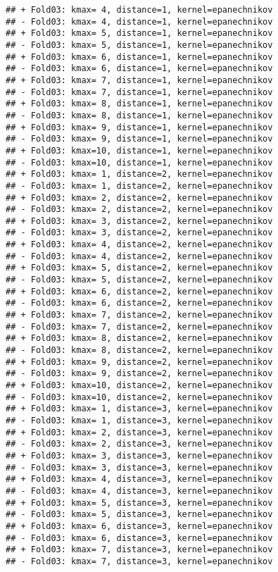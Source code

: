 \documentclass[
]{article}
\begin{document}
\begin{verbatim}
## + Fold03: kmax= 4, distance=1, kernel=epanechnikov 
## - Fold03: kmax= 4, distance=1, kernel=epanechnikov 
## + Fold03: kmax= 5, distance=1, kernel=epanechnikov 
## - Fold03: kmax= 5, distance=1, kernel=epanechnikov 
## + Fold03: kmax= 6, distance=1, kernel=epanechnikov 
## - Fold03: kmax= 6, distance=1, kernel=epanechnikov 
## + Fold03: kmax= 7, distance=1, kernel=epanechnikov 
## - Fold03: kmax= 7, distance=1, kernel=epanechnikov 
## + Fold03: kmax= 8, distance=1, kernel=epanechnikov 
## - Fold03: kmax= 8, distance=1, kernel=epanechnikov 
## + Fold03: kmax= 9, distance=1, kernel=epanechnikov 
## - Fold03: kmax= 9, distance=1, kernel=epanechnikov 
## + Fold03: kmax=10, distance=1, kernel=epanechnikov 
## - Fold03: kmax=10, distance=1, kernel=epanechnikov 
## + Fold03: kmax= 1, distance=2, kernel=epanechnikov 
## - Fold03: kmax= 1, distance=2, kernel=epanechnikov 
## + Fold03: kmax= 2, distance=2, kernel=epanechnikov 
## - Fold03: kmax= 2, distance=2, kernel=epanechnikov 
## + Fold03: kmax= 3, distance=2, kernel=epanechnikov 
## - Fold03: kmax= 3, distance=2, kernel=epanechnikov 
## + Fold03: kmax= 4, distance=2, kernel=epanechnikov 
## - Fold03: kmax= 4, distance=2, kernel=epanechnikov 
## + Fold03: kmax= 5, distance=2, kernel=epanechnikov 
## - Fold03: kmax= 5, distance=2, kernel=epanechnikov 
## + Fold03: kmax= 6, distance=2, kernel=epanechnikov 
## - Fold03: kmax= 6, distance=2, kernel=epanechnikov 
## + Fold03: kmax= 7, distance=2, kernel=epanechnikov 
## - Fold03: kmax= 7, distance=2, kernel=epanechnikov 
## + Fold03: kmax= 8, distance=2, kernel=epanechnikov 
## - Fold03: kmax= 8, distance=2, kernel=epanechnikov 
## + Fold03: kmax= 9, distance=2, kernel=epanechnikov 
## - Fold03: kmax= 9, distance=2, kernel=epanechnikov 
## + Fold03: kmax=10, distance=2, kernel=epanechnikov 
## - Fold03: kmax=10, distance=2, kernel=epanechnikov 
## + Fold03: kmax= 1, distance=3, kernel=epanechnikov 
## - Fold03: kmax= 1, distance=3, kernel=epanechnikov 
## + Fold03: kmax= 2, distance=3, kernel=epanechnikov 
## - Fold03: kmax= 2, distance=3, kernel=epanechnikov 
## + Fold03: kmax= 3, distance=3, kernel=epanechnikov 
## - Fold03: kmax= 3, distance=3, kernel=epanechnikov 
## + Fold03: kmax= 4, distance=3, kernel=epanechnikov 
## - Fold03: kmax= 4, distance=3, kernel=epanechnikov 
## + Fold03: kmax= 5, distance=3, kernel=epanechnikov 
## - Fold03: kmax= 5, distance=3, kernel=epanechnikov 
## + Fold03: kmax= 6, distance=3, kernel=epanechnikov 
## - Fold03: kmax= 6, distance=3, kernel=epanechnikov 
## + Fold03: kmax= 7, distance=3, kernel=epanechnikov 
## - Fold03: kmax= 7, distance=3, kernel=epanechnikov 

\end{verbatim}
\end{document}
